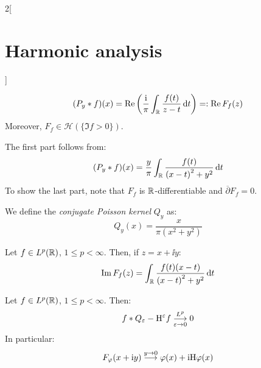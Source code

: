 \documentclass[../../../main_math.tex]{subfiles}
\begin{document}
\begin{multicols}{2}[\section{Harmonic analysis}]
\begin{lemma}
    $$
      (P_y*f)(x)=\Re\left(\frac{\mathrm{i}}{\pi}\int_{\mathbb{R}}\frac{f(t)}{z-t}\dd{t}\right)=:\Re F_f(z)
    $$
    Moreover, $F_f\in\mathcal{H}(\{\Im f>0\})$.
  \end{lemma}
  \begin{sproof}
    The first part follows from:
    $$
      (P_y*f)(x)=\frac{y}{\pi}\int_{\mathbb{R}}\frac{f(t)}{{(x-t)}^2+y^2}\dd{t}
    $$
    To show the last part, note that $F_f$ is $\mathbb{R}$-differentiable and $\overline{\partial}F_f=0$.
  \end{sproof}
  \begin{definition}
    We define the \emph{conjugate Poisson kernel} $Q_y$ as:
    $$
      Q_y(x)=\frac{x}{\pi(x^2+y^2)}
    $$
  \end{definition}
  \begin{lemma}
    Let $f\in L^p(\mathbb{R})$, $1\leq p <\infty$. Then, if $z=x+\ii y$:
    $$
      \Im F_f(z) =\int_{\mathbb{R}} \frac{f(t)(x-t)}{{(x-t)}^2+y^2}\dd{t}
    $$
  \end{lemma}
  \begin{theorem}
    Let $f\in L^p(\mathbb{R})$, $1\leq p <\infty$. Then:
    $$
      f*Q_\varepsilon -\mathrm{H}^\varepsilon f\overset{L^p}{\underset{\varepsilon\to 0}{\longrightarrow}} 0
    $$
    In particular:
    $$
      F_\varphi(x+\mathrm{i} y) \overset{y\to 0}{\longrightarrow} \varphi(x) + \mathrm{i} \mathrm{H} \varphi(x)
    $$
  \end{theorem}

\end{multicols}
\end{document}

